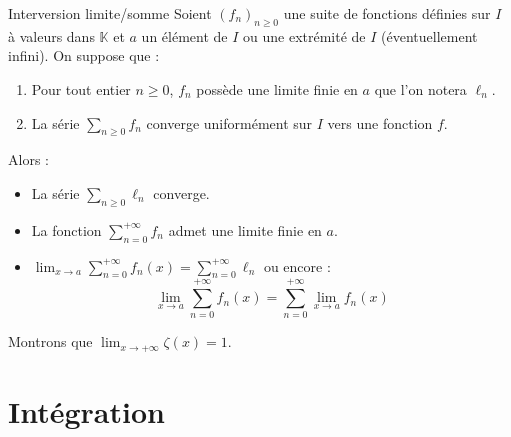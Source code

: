 \documentclass[french,11pt,twoside]{VcCours}
\begin{document}
\begin{Theoreme}{Interversion limite/somme}
Soient $(f_n)_{n \geq 0}$ une suite de fonctions définies sur $I$ à valeurs dans $\mathbb{K}$ et $a$ un élément de $I$ ou une extrémité de $I$ (éventuellement infini). On suppose que :

\begin{enumerate}
\item Pour tout entier $n \geq 0$, $f_n$ possède une limite finie en $a$ que l'on notera $\ell_n$.
\item La série $ \sum_{ n \geq 0} f_n$ converge uniformément sur $I$ vers une fonction $f$.
\end{enumerate}
Alors :

\begin{itemize}
\item La série $ \sum_{n \geq 0} \ell_n$ converge.
\item La fonction $\sum_{n=0}^{+ \infty} f_n $ admet une limite finie en $a$.
\item $\lim_{x \rightarrow a} \sum_{n=0}^{+ \infty} f_n(x) = \sum_{n=0}^{+ \infty} \ell_n$ ou encore :
$$  \lim_{x \rightarrow a} \sum_{n=0}^{+ \infty} f_n(x) = \sum_{n=0}^{+ \infty} \lim_{x \rightarrow a} f_n(x)$$
\end{itemize}
\end{Theoreme}

\begin{Exemple} Montrons que $\lim_{x \rightarrow + \infty} \zeta(x) = 1$.

%

\vspace*{8cm}
\end{Exemple}

\newpage
\section{Intégration}
\end{document}
